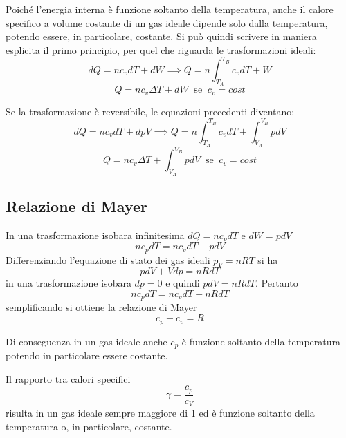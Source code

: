 \documentclass[class=book, crop=false, oneside, 12pt]{standalone}
\begin{document}
Poiché l'energia interna è funzione soltanto della temperatura, anche il calore specifico a volume costante di un gas ideale dipende solo dalla temperatura, potendo essere, in particolare, costante.
Si può quindi scrivere in maniera esplicita il primo principio, per quel che riguarda le trasformazioni ideali:
\begin{equation} \label{primo_principio_trasf_ideali}
    d Q = n c_v d T + d W \implies Q = n \int_{T_A}^{T_B} c_v d T + W
\end{equation}
\begin{equation}
    Q = n c_v \Delta T + d W \ \text{ se } \ c_v = cost
\end{equation}

Se la trasformazione è reversibile, le equazioni precedenti diventano:
\begin{equation}
    d Q = n c_v d T + d p V \implies Q = n \int_{T_A}^{T_B} c_v d T + \int_{V_A}^{V_B} p d V
\end{equation}
\begin{equation}
    Q = n c_v \Delta T + \int_{V_A}^{V_B} p d V \ \text{ se } \ c_v = cost
\end{equation}

\subsection{Relazione di Mayer}

In una trasformazione isobara infinitesima \(d Q = n c_p d T\) e \(d W = p d V\)
\begin{equation*}
    n c_p d T = n c_v d T + p d V
\end{equation*}
Differenziando l'equazione di stato dei gas ideali \(p_V = n R T\) si ha
\begin{equation*}
    p d V + V d p = n R d T
\end{equation*}
in una trasformazione isobara \(d p = 0\) e quindi \(p d V = n R d T\). Pertanto
\begin{equation*}
    n c_p d T = n c_v d T + n R d T
\end{equation*}
semplificando si ottiene la relazione di Mayer
\begin{equation}
    c_p - c_v = R
\end{equation}

Di conseguenza in un gas ideale anche \(c_p\) è funzione soltanto della temperatura potendo in particolare essere costante.

Il rapporto tra calori specifici
\begin{equation}
    \gamma = \frac{c_p}{c_V}
\end{equation}
risulta in un gas ideale sempre maggiore di 1 ed è funzione soltanto della temperatura o, in particolare, costante. 
\end{document}
